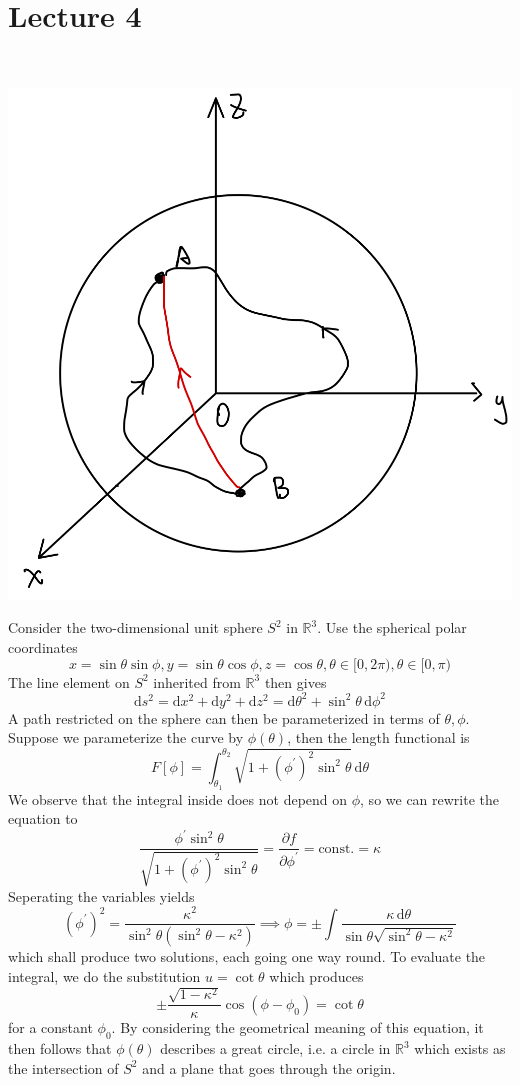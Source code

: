 \documentclass[a4paper]{article}
\begin{document}
\part*{Lecture 4}
\begin{example}\ 
    \begin{center}
        \includegraphics[scale=0.13]{geodesics_sphere.jpeg}
    \end{center}
    Consider the two-dimensional unit sphere $S^2$ in $\mathbb R^3$.
    Use the spherical polar coordinates
    $$x=\sin\theta\sin\phi,y=\sin\theta\cos\phi,z=\cos\theta,\theta\in [0,2\pi),\theta\in[0,\pi)$$
    The line element on $S^2$ inherited from $\mathbb R^3$ then gives
    $$\mathrm ds^2=\mathrm dx^2+\mathrm dy^2+\mathrm dz^2=\mathrm d\theta^2+\sin^2\theta\,\mathrm d\phi^2$$
    A path restricted on the sphere can then be parameterized in terms of $\theta,\phi$.
    Suppose we parameterize the curve by $\phi(\theta)$, then the length functional is
    $$F[\phi]=\int_{\theta_1}^{\theta_2}\sqrt{1+(\phi^\prime)^2\sin^2\theta}\,\mathrm d\theta$$
    We observe that the integral inside does not depend on $\phi$, so we can rewrite the equation to
    $$\frac{\phi^\prime\sin^2\theta}{\sqrt{1+(\phi^\prime)^2\sin^2\theta}}=\frac{\partial f}{\partial \phi^\prime}=\text{const.}=\kappa$$
    Seperating the variables yields
    $$(\phi^\prime)^2=\frac{\kappa^2}{\sin^2\theta(\sin^2\theta-\kappa^2)}\implies\phi=\pm\int\frac{\kappa\,\mathrm d\theta}{\sin\theta\sqrt{\sin^2\theta-\kappa^2}}$$
    which shall produce two solutions, each going one way round.
    To evaluate the integral, we do the substitution $u=\cot\theta$ which produces
    $$\pm\frac{\sqrt{1-\kappa^2}}{\kappa}\cos(\phi-\phi_0)=\cot\theta$$
    for a constant $\phi_0$.
    By considering the geometrical meaning of this equation, it then follows that $\phi(\theta)$ describes a great circle, i.e. a circle in $\mathbb R^3$ which exists as the intersection of $S^2$ and a plane that goes through the origin.
\end{example}
\end{document}
